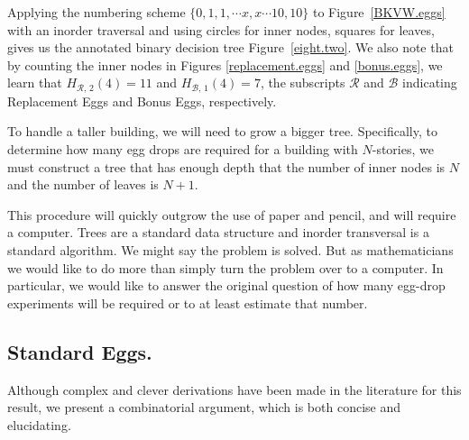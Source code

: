\documentclass[12pt]{amsart}
\theoremstyle{definition}
\theoremstyle{theorem}
\begin{document}
Applying the numbering scheme $\{0, 1, 1, \cdots x, x \cdots 10, 10\}$ to 
Figure~\ref{BKVW.eggs} with an inorder traversal and using circles for inner nodes, squares for leaves,
gives us the annotated binary decision tree Figure~\ref{eight.two}.  We also note that by 
counting the inner nodes
in Figures \ref{replacement.eggs} and \ref{bonus.eggs}, we learn that 
$H_{{\mathcal R},\,2}(4) = 11$ and $H_{{\mathcal B},\,1}(4) = 7$, the subscripts 
$\mathcal R$ and $\mathcal B$ indicating Replacement Eggs and Bonus Eggs, respectively.

\medskip 
To handle a taller building, we will need to grow a bigger tree. Specifically,
to determine how many egg drops are required for a  building
with $N$-stories,
we must construct a tree that has enough depth that the number of
inner nodes is $N$ and the number of  leaves 
is $N+1$.  

This procedure will quickly outgrow the use of paper
and pencil, and will require a computer. Trees are a 
standard data structure and inorder transversal is a standard 
algorithm.  We might say  the problem is solved. But as mathematicians
we would like to do more than simply turn the problem over to a 
computer. In particular,  we would like to answer the
original question of how many egg-drop experiments will be required
or to at least estimate that number.

\subsection{Standard Eggs.} \label{bkvw}
Although complex and clever derivations have been made in the literature for this result, we present a combinatorial argument, which is both concise and elucidating.
\end{document}
